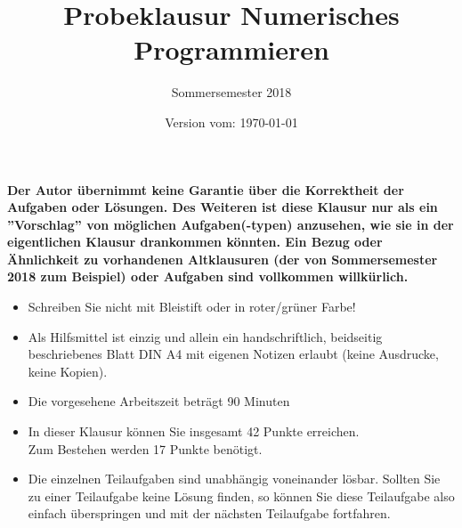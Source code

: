 \documentclass{scrartcl}
\begin{document}
\title{Probeklausur Numerisches Programmieren}
\subtitle{Sommersemester 2018}
\author{\npauthor{}}
\date{Version vom: \today}
\maketitle

\textbf{Der Autor übernimmt keine Garantie über die Korrektheit der Aufgaben oder Lösungen. \n Des Weiteren ist diese Klausur nur als ein ''Vorschlag'' von möglichen Aufgaben(-typen) anzusehen, wie sie in der eigentlichen Klausur drankommen könnten. Ein Bezug oder Ähnlichkeit zu vorhandenen Altklausuren (der von Sommersemester 2018 zum Beispiel) oder Aufgaben sind vollkommen willkürlich.}
\sbreak

\begin{itemize}
	\item Schreiben Sie nicht mit Bleistift oder in roter/grüner Farbe!
	\item Als Hilfsmittel ist einzig und allein ein handschriftlich, beidseitig beschriebenes Blatt DIN A4 mit eigenen Notizen erlaubt (keine Ausdrucke, keine Kopien).
	\item Die vorgesehene Arbeitszeit beträgt 90 Minuten
	\item In dieser Klausur können Sie insgesamt 42 Punkte erreichen. \\Zum Bestehen werden 17 Punkte benötigt.
	\item Die einzelnen Teilaufgaben sind unabhängig voneinander lösbar.
	Sollten Sie zu einer Teilaufgabe keine Lösung finden, so können Sie diese Teilaufgabe also einfach überspringen und mit der nächsten Teilaufgabe fortfahren.
\end{itemize}


	
\end{document}
